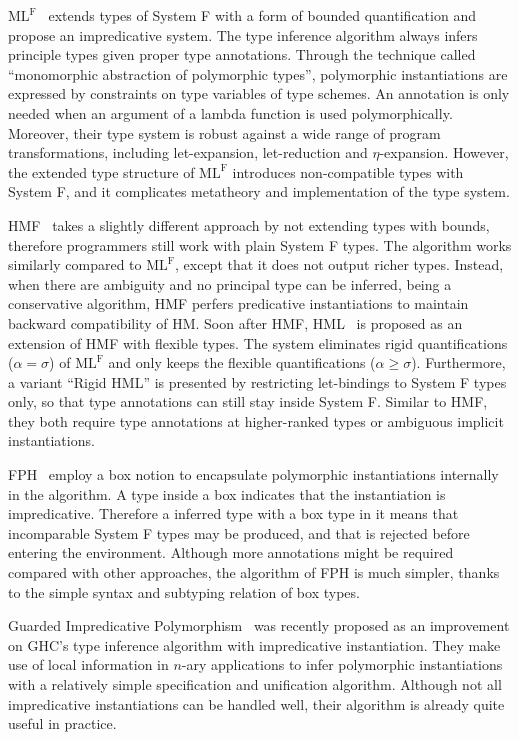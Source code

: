 $\text{ML}^\text{F}$~\citep{le2003ml,remy2008from,Botlan2009recasting}
extends types of System F with a form of bounded quantification
and propose an impredicative system.
The type inference algorithm always infers principle types given proper type annotations.
Through the technique called ``monomorphic abstraction of polymorphic types'',
polymorphic instantiations are expressed by constraints
on type variables of type schemes.
An annotation is only needed when an argument of a lambda function
is used polymorphically.
Moreover, their type system is robust against a wide range of program transformations,
including let-expansion, let-reduction and $\eta$-expansion.
However, the extended type structure of $\text{ML}^\text{F}$
introduces non-compatible types with System F,
and it complicates metatheory and implementation of the type system.

HMF~\citep{leijen2008hmf} takes a slightly different approach
by not extending types with bounds,
therefore programmers still work with plain System F types.
The algorithm works similarly compared to $\text{ML}^\text{F}$,
except that it does not output richer types.
Instead, when there are ambiguity and no principal type can be inferred,
being a conservative algorithm,
HMF perfers predicative instantiations
to maintain backward compatibility of HM.
Soon after HMF, HML~\citep{leijen2009flexible} is proposed as
an extension of HMF with flexible types.
The system eliminates rigid quantifications ($\alpha = \sigma$)
of $\text{ML}^\text{F}$ and only keeps the flexible quantifications ($\alpha \ge \sigma$).
Furthermore, a variant ``Rigid HML'' is presented
by restricting let-bindings to System F types only,
so that type annotations can still stay inside System F.
Similar to HMF, they both require type annotations at higher-ranked
types or ambiguous implicit instantiations.

FPH~\citep{vytiniotis2008fph} employ a box notion \framebox{$\sigma$} to
encapsulate polymorphic instantiations internally in the algorithm.
A type inside a box indicates that the instantiation is impredicative.
Therefore a inferred type with a box type in it means that
incomparable System F types may be produced,
and that is rejected before entering the environment.
Although more annotations might be required compared with other approaches,
the algorithm of FPH is much simpler,
thanks to the simple syntax and subtyping relation of box types.


Guarded Impredicative Polymorphism~\citep{Serrano2018} was recently proposed
as an improvement on GHC's type inference algorithm with impredicative instantiation.
They make use of local information in $n$-ary applications to
infer polymorphic instantiations with a relatively simple specification and unification algorithm.
Although not all impredicative instantiations can be handled well,
their algorithm is already quite useful in practice.

